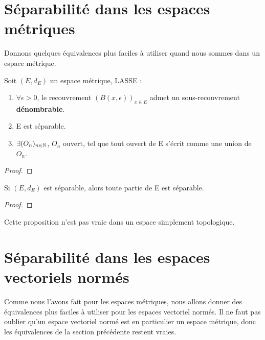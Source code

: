 \section{Séparabilité dans les espaces métriques}

Donnons quelques équivalences plus faciles à utiliser quand nous sommes dans un
espace métrique.

\begin{proposition}
	Soit $(E, d_{E})$ un espace métrique, LASSE :
	\begin{enumerate}
		\item $\forall \epsilon > 0$, le recouvrement $(B(x, \epsilon))_{x \in
			E}$ admet un sous-recouvrement \textbf{dénombrable}.
		\item E est séparable.
		\item $\exists (O_{n})_{n \in \mathbb{N}}$, $O_{n}$ ouvert, tel que
			tout ouvert de E s'écrit comme une union de $O_{n}$.
	\end{enumerate}
\end{proposition}

\ifdefined\outputproof
\begin{proof}

\end{proof}
\fi

\begin{proposition}
	Si $(E, d_{E})$ est séparable, alors toute partie de E est séparable.
\end{proposition}

\ifdefined\outputproof
\begin{proof}

\end{proof}
\fi

\begin{remarque}
	Cette proposition n'est pas vraie dans un espace simplement topologique.
\end{remarque}

\section{Séparabilité dans les espaces vectoriels normés}

Comme nous l'avons fait pour les espaces métriques, nous allons donner des
équivalences plus faciles à utiliser pour les espaces vectoriel normés. Il ne
faut pas oublier qu'un espace vectoriel normé est en particulier un espace
métrique, donc les équivalences de la section précédente restent vraies.

